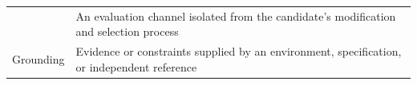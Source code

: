 \documentclass[11pt,american,]{article}
\begin{document}
\begin{longtable}[]{@{}ll@{}}
\begin{minipage}[t]{0.47\columnwidth}
\end{minipage} & \begin{minipage}[t]{0.47\columnwidth}\raggedright
An evaluation channel isolated from the candidate's modification and
selection process\strut
\end{minipage}\tabularnewline
\begin{minipage}[t]{0.47\columnwidth}\raggedright
Grounding\strut
\end{minipage} & \begin{minipage}[t]{0.47\columnwidth}\raggedright
Evidence or constraints supplied by an environment, specification, or
independent reference\strut
\end{minipage}\tabularnewline
\bottomrule
\end{longtable}

\clearpage

\end{document}

